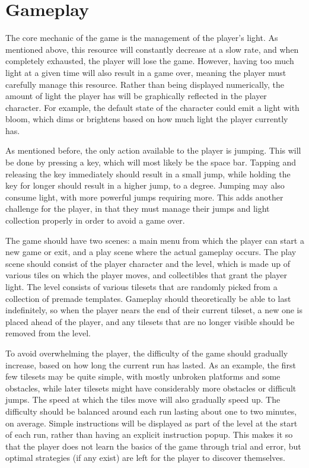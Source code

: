 \documentclass[10pt]{article}
\begin{document}
\section{Gameplay}

The core mechanic of the game is the management of the player's light. As mentioned above, this resource will constantly decrease at a slow rate,
and when completely exhausted, the player will lose the game. However, having too much light at a given time will also result in a game over,
meaning the player must carefully manage this resource. Rather than being displayed numerically, the amount of light the player has will be
graphically reflected in the player character. For example, the default state of the character could emit a light with bloom, which dims
or brightens based on how much light the player currently has.

As mentioned before, the only action available to the player is jumping. This will be done by pressing a key, which will most likely be the space bar.
Tapping and releasing the key immediately should result in a small jump, while holding the key for longer should result in a higher jump, to a degree.
Jumping may also consume light, with more powerful jumps requiring more. This adds another challenge for the player, in that they must manage their jumps
and light collection properly in order to avoid a game over.

The game should have two scenes: a main menu from which the player can start a new game or exit, and a play scene where the actual gameplay occurs.
The play scene should consist of the player character and the level, which is made up of various tiles on which the player moves, and collectibles
that grant the player light. The level consists of various tilesets that are randomly picked from a collection of premade templates. Gameplay should
theoretically be able to last indefinitely, so when the player nears the end of their current tileset, a new one is placed ahead of the player,
and any tilesets that are no longer visible should be removed from the level.

To avoid overwhelming the player, the difficulty of the game should gradually increase, based on how long the current run has lasted.
As an example, the first few tilesets may be quite simple, with mostly unbroken platforms and some obstacles, while later tilesets
might have considerably more obstacles or difficult jumps. The speed at which the tiles move will also gradually speed up.
The difficulty should be balanced around each run lasting about one to two minutes, on average.
Simple instructions will be displayed as part of the level at the start of each run, rather than having an explicit instruction popup.
This makes it so that the player does not learn the basics of the game through trial and error, but optimal strategies (if any exist)
are left for the player to discover themselves.
\end{document}
